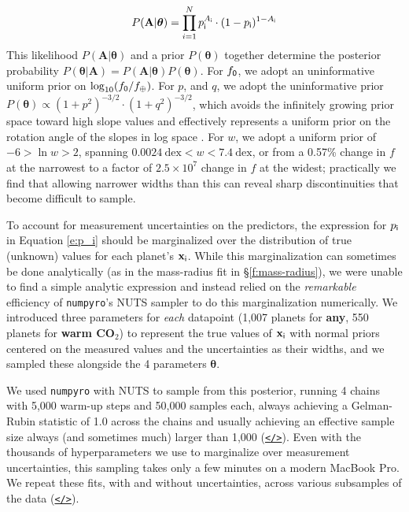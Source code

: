 \documentclass[modern,linenumbers,trackchanges]{aastex7}
\begin{document}
\begin{equation}
P(\mathbf{A} | \boldsymbol{\theta}) = \prod_{i=1}^{N} p_{\sf i}^{A_{\sf i}} \cdot (1-p_{\sf i})^{1-A_{\sf i}}
\end{equation} 
This likelihood $P(\mathbf{A} | \boldsymbol{\theta})$
 and a prior $P(\boldsymbol{\theta})$ together determine the posterior probability $P(\boldsymbol{\theta} | \mathbf{A}) = P(\mathbf{A} | \boldsymbol{\theta}) P(\boldsymbol{\theta})$. For $f_{\sf 0}$, we adopt an uninformative uniform prior on $\log_{10} (f_{\sf 0}/f_\oplus)$. For $p$, and $q$, we adopt the uninformative prior $P(\boldsymbol{\theta}) \propto (1+p^2)^{-3/2}\cdot (1+q^2)^{-3/2}$, which avoids the infinitely growing prior space toward high slope values and effectively represents a uniform prior on the rotation angle of the slopes in log space \citep[see][]{vanderplasFrequentismBayesianismPythondriven2014a}. For $w$, we adopt a uniform prior of $-6 > \ln w > 2$,  spanning $0.0024~\mathrm{dex} < w < 7.4~\mathrm{dex}$, or from a 0.57\% change in $f$ at the narrowest to a factor of $2.5\times10^7$ change in $f$ at the widest; practically we find that allowing narrower widths than this can reveal sharp discontinuities that become difficult to sample. 

To account for measurement uncertainties on the predictors, the expression for $p_{\sf i}$ in Equation \ref{e:p_i} should be marginalized over the distribution of true (unknown) values for each planet's $\mathbf{x}_{\sf i}$. While this marginalization can sometimes be done analytically (as in the mass-radius fit in \S\ref{f:mass-radius}), we were unable to find a simple analytic expression and instead relied on the {\em remarkable} efficiency of \texttt{numpyro}'s NUTS sampler to do this marginalization numerically. We introduced three parameters for {\em each} datapoint (1,007 planets for {\bf any}, 550 planets for {\bf warm CO$_2$}) to represent the true values of $\mathbf{x}_{\sf i}$ with normal priors centered on the measured values and the uncertainties as their widths, and we sampled these alongside the 4 parameters $\boldsymbol{\theta}$. 

We used \texttt{numpyro} with NUTS to sample from this posterior, running 4 chains with 5,000 warm-up steps and 50,000 samples each, always achieving a Gelman-Rubin statistic of 1.0 across the chains and usually achieving an effective sample size always (and sometimes much) larger than 1,000 (\href{https://github.com/zkbt/shoreline/blob/main/notebooks/fit-one-shoreline.ipynb}{\texttt{</>}}). Even with the thousands of hyperparameters we use to marginalize over measurement uncertainties, this sampling takes only a few minutes on a modern MacBook Pro. We repeat these fits, with and without uncertainties, across various subsamples of the data (\href{https://github.com/zkbt/shoreline/blob/main/notebooks/fit-many-shorelines.ipynb}{\texttt{</>}}).
\end{document}
